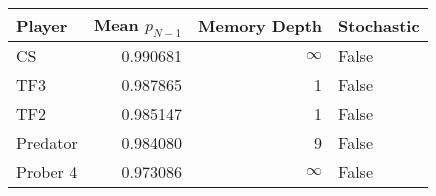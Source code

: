 \begin{tabular}{lrrl}
\toprule
   Player &  Mean $p_{N-1}$ &  Memory Depth & Stochastic \\
\midrule
       CS &        0.990681 &            \(\infty\) &      False \\
      TF3 &        0.987865 &             1 &      False \\
      TF2 &        0.985147 &             1 &      False \\
 Predator &        0.984080 &             9 &      False \\
 Prober 4 &        0.973086 &            \(\infty\) &      False \\
\bottomrule
\end{tabular}
